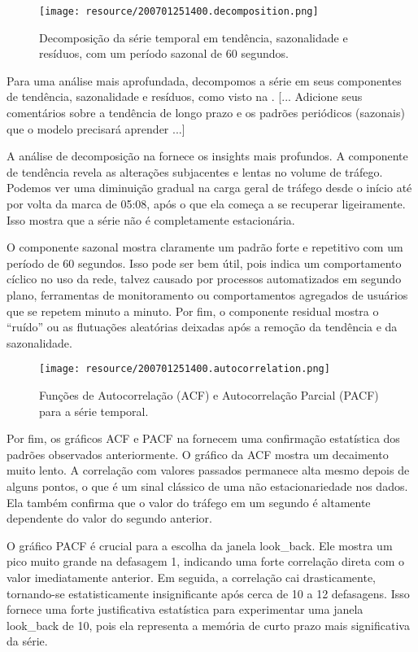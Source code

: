 \begin{figure}[!htb]
    \centering
    \texttt{[image: resource/200701251400.decomposition.png]}
    \caption{Decomposição da série temporal em tendência, sazonalidade e resíduos, com um período sazonal de
    60 segundos.}
    \label{fig:eda-decomposition}
\end{figure}

Para uma análise mais aprofundada, decompomos a série em seus componentes de tendência, sazonalidade e
resíduos, como visto na .
[... Adicione seus comentários sobre a tendência de longo prazo e os padrões periódicos (sazonais) que o
modelo precisará aprender ...]

A análise de decomposição na  fornece os insights mais profundos. A componente de
tendência revela as alterações subjacentes e lentas no volume de tráfego. Podemos ver uma diminuição gradual
na carga geral de tráfego desde o início até por volta da marca de 05:08, após o que ela começa a se
recuperar ligeiramente. Isso mostra que a série não é completamente estacionária.

O componente sazonal mostra claramente um padrão forte e repetitivo com um período de 60 segundos. Isso pode
ser bem útil, pois indica um comportamento cíclico no uso da rede, talvez causado por processos automatizados
em segundo plano, ferramentas de monitoramento ou comportamentos agregados de usuários que se repetem minuto
a minuto. Por fim, o componente residual mostra o ``ruído'' ou as flutuações aleatórias deixadas após a
remoção da tendência e da sazonalidade.

\begin{figure}[!htb]
    \centering
    \texttt{[image: resource/200701251400.autocorrelation.png]}
    \caption{Funções de Autocorrelação (ACF) e Autocorrelação Parcial (PACF) para a série temporal.}
    \label{fig:eda-acf-pacf}
\end{figure}

Por fim, os gráficos ACF e PACF na  fornecem uma confirmação estatística dos padrões
observados anteriormente.
O gráfico da ACF mostra um decaimento muito lento. A correlação com valores passados permanece alta mesmo
depois de alguns pontos, o que é um sinal clássico de uma não estacionariedade nos dados. Ela também confirma
que o valor do tráfego em um segundo é altamente dependente do valor do segundo anterior.

O gráfico PACF é crucial para a escolha da janela look_back. Ele mostra um pico muito grande na defasagem 1,
indicando uma forte correlação direta com o valor imediatamente anterior. Em seguida, a correlação cai
drasticamente, tornando-se estatisticamente insignificante após cerca de 10 a 12 defasagens. Isso fornece uma
forte justificativa estatística para experimentar uma janela look_back de 10, pois ela representa a memória
de curto prazo mais significativa da série.
